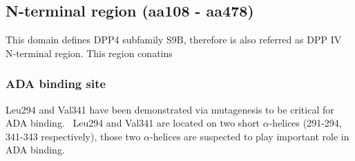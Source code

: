 \subsection{N-terminal region (aa108 - aa478)}

This domain defines DPP4 subfamily S9B, therefore is also referred as DPP IV N-terminal region. This region conatins 

\subsubsection{ADA binding site}
Leu294 and Val341 have been demonstrated via mutagenesis to be critical for ADA binding.~\cite{Abbott_1999} Leu294 and Val341 are located on two short $\alpha$-helices (291-294, 341-343 respectively), those two $\alpha$-helices are suspected to play important role in ADA binding. 